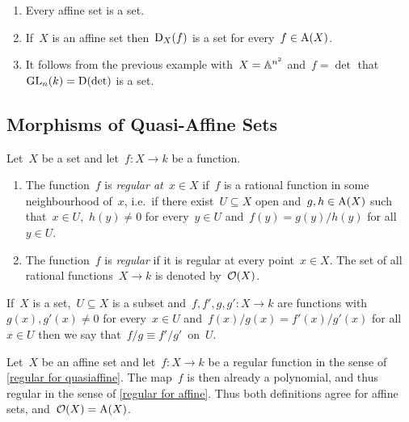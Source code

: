 \begin{example}
  \leavevmode
  \begin{enumerate}
    \item
      Every affine set is a {\qaffine} set.
    \item
      If~$X$ is an affine set then~$\operatorname{D}_X(f)$ is a {\qaffine} set for every~$f \in \operatorname{A}(X)$.
    \item
      It follows from the previous example with~$X = \mathbb{A}^{n^2}$ and~$f = \det$ that~$\operatorname{GL}_n(k) = \operatorname{D}(\det)$ is a {\qaffine} set.
  \end{enumerate}
\end{example}





\subsection{Morphisms of Quasi-Affine Sets}


\begin{definition}
  \label{regular for quasiaffine}
  Let~$X$ be a {\qaffine} set and let~$f \colon X \to k$ be a function.
  \begin{enumerate}
    \item
      The function~$f$ is \emph{regular at~$x \in X$} if~$f$ is a rational function in some neighbourhood of~$x$, i.e.\ if there exist~$U \subseteq X$ open and~$g, h \in \operatorname{A}(X)$ such that~$x \in U$,~$h(y) \neq 0$ for every~$y \in U$ and~$f(y) = g(y)/h(y)$ for all~$y \in U$.
    \item
      The function~$f$ is \emph{regular} if it is regular at every point~$x \in X$.
      The set of all rational functions~$X \to k$ is denoted by~$\mathcal{O}(X)$.
  \end{enumerate}
\end{definition}


\begin{notation}
  If~$X$ is a set,~$U \subseteq X$ is a subset and~$f, f', g, g' \colon X \to k$ are functions with~$g(x), g'(x) \neq 0$ for every~$x \in U$ and~$f(x)/g(x) = f'(x)/g'(x)$ for all~$x \in U$ then we say that~$f/g \equiv f'/g'$~on~$U$.
\end{notation}


\begin{proposition}
  \label{regular on affine is polynomial}
  Let~$X$ be an affine set and let~$f \colon X \to k$ be a regular function in the sense of \cref{regular for quasiaffine}.
  The map~$f$ is then already a polynomial, and thus regular in the sense of \cref{regular for affine}.
  Thus both definitions agree for affine sets, and~$\mathcal{O}(X) = \operatorname{A}(X)$.
\end{proposition}


